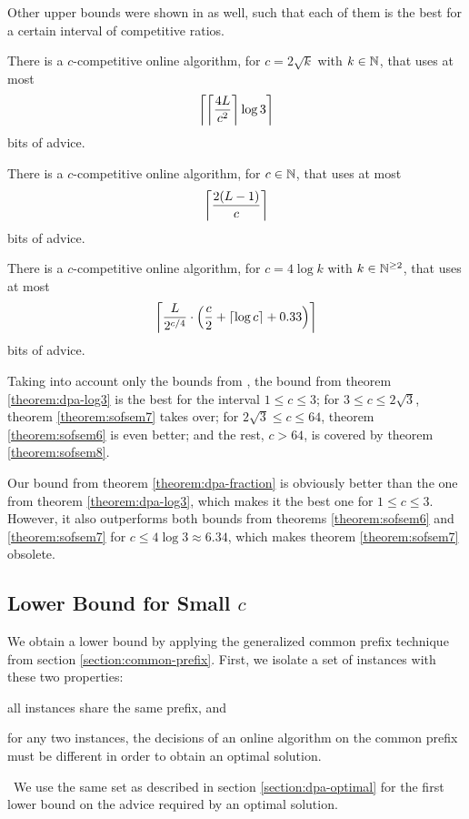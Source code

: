 Other upper bounds were shown in \cite{sofsem2014} as well, such that each
of them is the best for a certain interval of competitive ratios.

\begin{theorem}\label{theorem:sofsem6}
    There is a $c$-competitive online algorithm, for $c = 2\sqrt{k}$ with
    $k \in \N$, that uses at most $$\ceil*{\ceil*{\frac{4L}{c^2}}\log3}$$
    bits of advice.
\end{theorem}

\begin{theorem}\label{theorem:sofsem7}
    There is a $c$-competitive online algorithm, for $c \in \N$, that uses
    at most $$\ceil*{\frac{2(L-1)}{c}}$$ bits of advice.
\end{theorem}

\begin{theorem}\label{theorem:sofsem8}
    There is a $c$-competitive online algorithm, for $c = 4\log{}k$ with
    $k \in \N^{\geq2}$, that uses at most 
    $$\ceil*{\frac{L}{2^{c/4}} \cdot \paren*{\frac{c}{2} + \ceil*{\log{}c}
    + 0.33}}$$
    bits of advice.
\end{theorem}

Taking into account only the bounds from \cite{sofsem2014}, the bound from
theorem \ref{theorem:dpa-log3} is the best for the interval $1 \leq c \leq
3$; for $3 \leq c \leq 2\sqrt{3}$, theorem \ref{theorem:sofsem7} takes
over; for $2\sqrt{3} \leq c \leq 64$, theorem \ref{theorem:sofsem6} is
even better; and the rest, $c > 64$, is covered by theorem
\ref{theorem:sofsem8}.

Our bound from theorem \ref{theorem:dpa-fraction} is obviously better than
the one from theorem \ref{theorem:dpa-log3}, which makes it the best one
for $1 \leq c \leq 3$. However, it also outperforms both bounds from
theorems \ref{theorem:sofsem6} and \ref{theorem:sofsem7} for $c \leq 4
\log3 \approx 6.34$, which makes theorem \ref{theorem:sofsem7} obsolete.

\subsection{Lower Bound for Small $c$}

We obtain a lower bound by applying the generalized common prefix
technique from section \ref{section:common-prefix}. First, we isolate a
set of instances with these two properties: \begin{inparaenum}\item all
instances share the same prefix, and \item for any two instances, the
decisions of an online algorithm on the common prefix must be different in
order to obtain an optimal solution.\end{inparaenum}\ We use the same set
as described in section \ref{section:dpa-optimal} for the first lower
bound on the advice required by an optimal solution.

